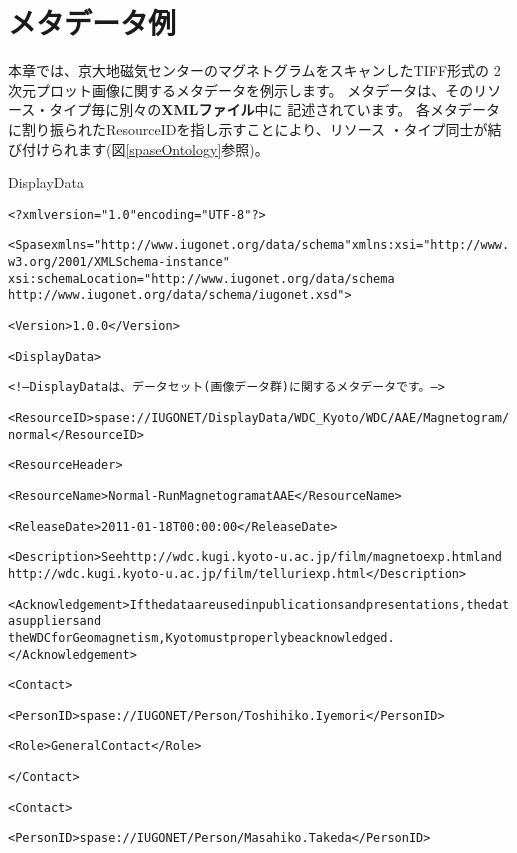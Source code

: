 \chapter{メタデータ例}
本章では、京大地磁気センターのマグネトグラムをスキャンしたTIFF形式の
2次元プロット画像に関するメタデータを例示します。
メタデータは、そのリソース・タイプ毎に別々の{\bf XMLファイル}中に
記述されています。
各メタデータに割り振られたResourceIDを指し示すことにより、リソース
・タイプ同士が結び付けられます(図\ref{spaseOntology}参照)。

\begin{itembox}[1]{DisplayData}
{\tiny
\begin{alltt}
<?xml version="1.0" encoding="UTF-8"?>

<Spase xmlns="http://www.iugonet.org/data/schema" xmlns:xsi="http://www.w3.org/2001/XMLSchema-instance" 
                    xsi:schemaLocation="http://www.iugonet.org/data/schema 
                    http://www.iugonet.org/data/schema/iugonet.xsd ">
  
  <Version>1.0.0</Version>

  {\color{blue}<DisplayData>

  <!-- DisplayDataは、データセット(画像データ群)に関するメタデータです。 -->}
    <ResourceID>spase://IUGONET/DisplayData/WDC_Kyoto/WDC/AAE/Magnetogram/normal</ResourceID>
  	
    <ResourceHeader>
  		
      <ResourceName>Normal-Run Magnetogram at AAE</ResourceName>
  		
      <ReleaseDate>2011-01-18T00:00:00</ReleaseDate>
  		
      <Description>See http://wdc.kugi.kyoto-u.ac.jp/film/magnetoexp.html and 
                   http://wdc.kugi.kyoto-u.ac.jp/film/telluriexp.html</Description>
  		
      <Acknowledgement>If the data are used in publications and presentations, the data suppliers and 
                       the WDC for Geomagnetism, Kyoto must properly be acknowledged.</Acknowledgement>

      <Contact>
  			
        <PersonID>spase://IUGONET/Person/Toshihiko.Iyemori</PersonID>
  			
        <Role>GeneralContact</Role>
  		
      </Contact>
  	
      <Contact>
  			
        <PersonID>spase://IUGONET/Person/Masahiko.Takeda</PersonID>
  			

\end{alltt}}
\end{itembox}
